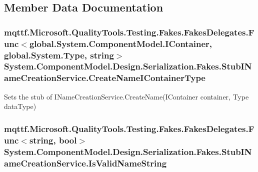 \subsection{Member Data Documentation}
\hypertarget{class_system_1_1_component_model_1_1_design_1_1_serialization_1_1_fakes_1_1_stub_i_name_creation_service_a89bcc2393289c03de56e7a90c45670e5}{
\subsubsection[{Create\-Name\-I\-Container\-Type}]{\setlength{\rightskip}{0pt plus 5cm}mqttf.\-Microsoft.\-Quality\-Tools.\-Testing.\-Fakes.\-Fakes\-Delegates.\-Func$<$global.\-System.\-Component\-Model.\-I\-Container, global.\-System.\-Type, string$>$ System.\-Component\-Model.\-Design.\-Serialization.\-Fakes.\-Stub\-I\-Name\-Creation\-Service.\-Create\-Name\-I\-Container\-Type}}\label{class_system_1_1_component_model_1_1_design_1_1_serialization_1_1_fakes_1_1_stub_i_name_creation_service_a89bcc2393289c03de56e7a90c45670e5}


Sets the stub of I\-Name\-Creation\-Service.\-Create\-Name(\-I\-Container container, Type data\-Type)

\hypertarget{class_system_1_1_component_model_1_1_design_1_1_serialization_1_1_fakes_1_1_stub_i_name_creation_service_a09bf41a17679901b76e5ce991fb5e859}{
\subsubsection[{Is\-Valid\-Name\-String}]{\setlength{\rightskip}{0pt plus 5cm}mqttf.\-Microsoft.\-Quality\-Tools.\-Testing.\-Fakes.\-Fakes\-Delegates.\-Func$<$string, bool$>$ System.\-Component\-Model.\-Design.\-Serialization.\-Fakes.\-Stub\-I\-Name\-Creation\-Service.\-Is\-Valid\-Name\-String}}\label{class_system_1_1_component_model_1_1_design_1_1_serialization_1_1_fakes_1_1_stub_i_name_creation_service_a09bf41a17679901b76e5ce991fb5e859}


